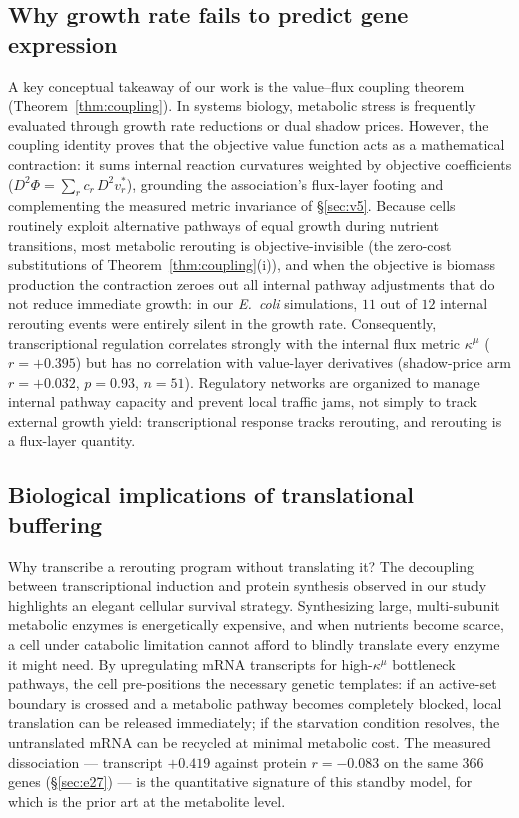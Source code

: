 \documentclass[11pt,a4paper]{article}
\theoremstyle{plain}
\theoremstyle{definition}
\theoremstyle{remark}
\newcommand{\kmu}{\kappa^{\mu}}
\begin{document}
\subsection{Why growth rate fails to predict gene expression}
A key conceptual takeaway of our work is the value--flux coupling
theorem (Theorem~\ref{thm:coupling}). In systems biology, metabolic
stress is frequently evaluated through growth rate reductions or dual
shadow prices. However, the coupling identity proves that the
objective value function acts as a mathematical contraction: it sums
internal reaction curvatures weighted by objective coefficients
($D^2\Phi = \sum_r c_r\, D^2 v^*_r$), grounding the association's
flux-layer footing and complementing the measured metric invariance
of \S\ref{sec:v5}. Because cells routinely exploit alternative
pathways of equal growth during nutrient transitions, most metabolic
rerouting is objective-invisible (the zero-cost substitutions of
Theorem~\ref{thm:coupling}(i)), and when the objective is biomass
production the contraction zeroes out all internal pathway
adjustments that do not reduce immediate growth: in our
\emph{E.~coli} simulations, $11$ out of $12$ internal rerouting
events were entirely silent in the growth rate. Consequently,
transcriptional regulation correlates strongly with the internal
flux metric $\kmu$ ($r = +0.395$) but has no correlation with
value-layer derivatives (shadow-price arm $r = +0.032$, $p = 0.93$,
$n = 51$). Regulatory networks are organized to manage internal
pathway capacity and prevent local traffic jams, not simply to track
external growth yield: transcriptional response tracks rerouting,
and rerouting is a flux-layer quantity.

\subsection{Biological implications of translational buffering}
Why transcribe a rerouting program without translating it? The
decoupling between transcriptional induction and protein synthesis
observed in our study highlights an elegant cellular survival
strategy. Synthesizing large, multi-subunit metabolic enzymes is
energetically expensive, and when nutrients become scarce, a cell
under catabolic limitation cannot afford to blindly translate every
enzyme it might need. By upregulating mRNA transcripts for
high-$\kmu$ bottleneck pathways, the cell pre-positions the
necessary genetic templates: if an active-set boundary is crossed and
a metabolic pathway becomes completely blocked, local translation
can be released immediately; if the starvation condition resolves,
the untranslated mRNA can be recycled at minimal metabolic cost. The
measured dissociation --- transcript $+0.419$ against protein
$r = -0.083$ on the same $366$ genes (\S\ref{sec:e27}) --- is the
quantitative signature of this standby model, for which
\citet{kochanowski2013} is the prior art at the metabolite level.
\end{document}
